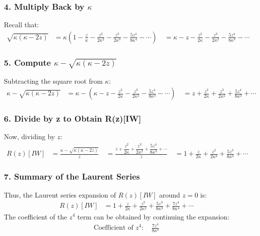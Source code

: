 \subsubsection*{4. Multiply Back by  $\kappa$ }

Recall that:
\begin{align}
\sqrt{\kappa(\kappa - 2z)} &= \kappa \left( 1 - \frac{z}{\kappa} - \frac{z^2}{2\kappa^2} - \frac{z^3}{2\kappa^3} - \frac{5z^4}{8\kappa^4} - \cdots \right) \
&= \kappa - z - \frac{z^2}{2\kappa} - \frac{z^3}{2\kappa^2} - \frac{5z^4}{8\kappa^3} - \cdots
\end{align}

\subsubsection*{5. Compute  $\kappa - \sqrt{\kappa(\kappa - 2z)}$ }

Subtracting the square root from  $\kappa$:
\begin{align}
\kappa - \sqrt{\kappa(\kappa - 2z)} &= \kappa - \left( \kappa - z - \frac{z^2}{2\kappa} - \frac{z^3}{2\kappa^2} - \frac{5z^4}{8\kappa^3} - \cdots \right) \
&= z + \frac{z^2}{2\kappa} + \frac{z^3}{2\kappa^2} + \frac{5z^4}{8\kappa^3} + \cdots
\end{align}

\subsubsection*{6. Divide by  z  to Obtain  R(z)[IW] }

Now, dividing by  $z$:
\begin{align}
R(z)[IW] &= \frac{\kappa - \sqrt{\kappa(\kappa - 2z)}}{z} \
&= \frac{ z + \dfrac{z^2}{2\kappa} + \dfrac{z^3}{2\kappa^2} + \dfrac{5z^4}{8\kappa^3} + \cdots }{ z } \
&= 1 + \frac{z}{2\kappa} + \frac{z^2}{2\kappa^2} + \frac{5z^3}{8\kappa^3} + \cdots
\end{align}

\subsubsection*{7. Summary of the Laurent Series}

Thus, the Laurent series expansion of  $R(z)[IW]$  around  $z=0$ is:
\begin{align}
R(z)[IW] &= 1 + \frac{z}{2\kappa} + \frac{z^2}{2\kappa^2} + \frac{5z^3}{8\kappa^3} + \frac{7z^4}{8\kappa^4} + \cdots
\end{align}
The coefficient of the  $z^4$  term can be obtained by continuing the expansion:
\begin{align}
\text{Coefficient of } z^4: \quad \frac{7z^4}{8\kappa^4}
\end{align}

